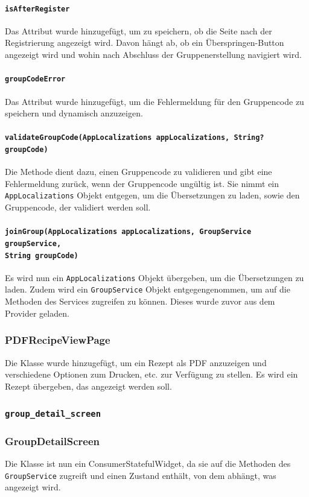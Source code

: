 \documentclass{implementierungsheft}
\begin{document}
\paragraph{\texttt{isAfterRegister}}
Das Attribut wurde hinzugefügt, um zu speichern, ob die Seite nach der Registrierung angezeigt wird. Davon hängt ab, ob ein Überspringen-Button angezeigt wird und wohin nach Abschluss der Gruppenerstellung navigiert wird.
\paragraph{\texttt{groupCodeError}}
Das Attribut wurde hinzugefügt, um die Fehlermeldung für den Gruppencode zu speichern und dynamisch anzuzeigen.
\paragraph*{\texttt{validateGroupCode(AppLocalizations appLocalizations, String? groupCode)}}
Die Methode dient dazu, einen Gruppencode zu validieren und gibt eine Fehlermeldung zurück, wenn der Gruppencode ungültig ist. Sie nimmt ein \texttt{AppLocalizations} Objekt entgegen, um die Übersetzungen zu laden, sowie den Gruppencode, der validiert werden soll.
\paragraph{\texttt{joinGroup(AppLocalizations appLocalizations, GroupService groupService,\\ String      groupCode)}}
Es wird nun ein \texttt{AppLocalizations} Objekt übergeben, um die Übersetzungen zu laden. Zudem wird ein \texttt{GroupService} Objekt entgegengenommen, um auf die Methoden des Services zugreifen zu können. Dieses wurde zuvor aus dem Provider geladen.
\subsubsection{PDFRecipeViewPage}
Die Klasse wurde hinzugefügt, um ein Rezept als PDF anzuzeigen und verschiedene Optionen zum Drucken, etc. zur Verfügung zu stellen. Es wird ein Rezept übergeben, das angezeigt werden soll.
\subsubsection{\texttt{group\_detail\_screen}}
\subsubsection*{GroupDetailScreen}
Die Klasse ist nun ein ConsumerStatefulWidget, da sie auf die Methoden des \texttt{GroupService} zugreift und einen Zustand enthält, von dem abhängt, was angezeigt wird.
\end{document}
